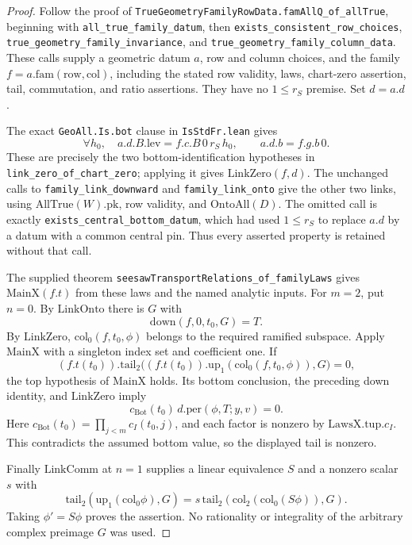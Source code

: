 \begin{proof}
Follow the proof of
\texttt{TrueGeometryFamilyRowData.famAllQ\_of\_allTrue}, beginning with
\texttt{all\_true\_family\_datum}, then
\texttt{exists\_consistent\_row\_choices},
\texttt{true\_geometry\_family\_invariance}, and
\texttt{true\_geometry\_family\_column\_data}.
These calls supply a geometric datum $a$, row and column choices, and
the family $f=a.\mathrm{fam}(\mathrm{row},\mathrm{col})$, including
the stated row validity, laws, chart-zero assertion, tail,
commutation, and ratio assertions.  They have no $1\leq r_S$
premise.  Set $d=a.d$.

The exact \texttt{GeoAll.Is.bot} clause in
\texttt{IsStdFr.lean} gives
\[
 \forall h_0,\quad a.d.B.\mathrm{lev}=f.c.B\,0\,r_S\,h_0,
 \qquad a.d.b=f.g.b\,0.
\]
These are precisely the two bottom-identification hypotheses in
\texttt{link\_zero\_of\_chart\_zero}; applying it gives
$\mathrm{LinkZero}(f,d)$.
The unchanged calls to \texttt{family\_link\_downward} and
\texttt{family\_link\_onto} give the other two links, using
$\mathrm{AllTrue}(W).\mathrm{pk}$, row validity, and
$\mathrm{OntoAll}(D)$.  The omitted call is exactly
\texttt{exists\_central\_bottom\_datum}, which had used $1\leq r_S$
to replace $a.d$ by a datum with a common central pin.  Thus every
asserted property is retained without that call.

The supplied theorem
\texttt{seesawTransportRelations\_of\_familyLaws} gives
$\mathrm{MainX}(f.t)$ from these laws and the named analytic inputs.
For $m=2$, put $n=0$.  By $\mathrm{LinkOnto}$ there is $G$ with
\[
 \mathrm{down}(f,0,t_0,G)=T.
\]
By $\mathrm{LinkZero}$, $\mathrm{col}_0(f,t_0,\phi)$ belongs to
the required ramified subspace.  Apply $\mathrm{MainX}$ with a
singleton index set and coefficient one.  If
\[
 (f.t(t_0)).\mathrm{tail}_2
 \bigl((f.t(t_0)).\mathrm{up}_1(\mathrm{col}_0(f,t_0,\phi)),G\bigr)=0,
\]
the top hypothesis of $\mathrm{MainX}$ holds.  Its bottom conclusion,
the preceding down identity, and $\mathrm{LinkZero}$ imply
\[
 c_{\mathrm{Bot}}(t_0)\,d.\mathrm{per}(\phi,T;y,v)=0.
\]
Here $c_{\mathrm{Bot}}(t_0)=\prod_{j<m}c_I(t_0,j)$, and each factor
is nonzero by $\mathrm{LawsX}.\mathrm{tup}.c_I$.  This contradicts
the assumed bottom value, so the displayed tail is nonzero.

Finally $\mathrm{LinkComm}$ at $n=1$ supplies a linear equivalence
$S$ and a nonzero scalar $s$ with
\[
 \mathrm{tail}_2(\mathrm{up}_1(\mathrm{col}_0\phi),G)
 =s\,\mathrm{tail}_2(\mathrm{col}_2(\mathrm{col}_0(S\phi)),G).
\]
Taking $\phi'=S\phi$ proves the assertion.  No rationality or
integrality of the arbitrary complex preimage $G$ was used.
\end{proof}

